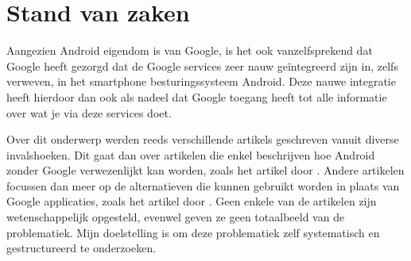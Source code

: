 
\section{Stand van zaken}
\label{sec:state-of-the-art}

Aangezien Android eigendom is van Google, is het ook vanzelfsprekend dat Google heeft gezorgd dat de Google services zeer nauw geïntegreerd zijn in, zelfs verweven, in het smartphone besturingssysteem Android. Deze nauwe integratie heeft hierdoor dan ook als nadeel dat Google toegang heeft tot alle informatie over wat je via deze services doet.

\vspace{2mm}

Over dit onderwerp werden reeds verschillende artikels geschreven vanuit diverse invalshoeken. Dit gaat dan over artikelen die enkel beschrijven hoe Android zonder Google verwezenlijkt kan worden, zoals het artikel door \autocite{BertelKing2016}. Andere artikelen focussen dan meer op de alternatieven die kunnen gebruikt worden in plaats van Google applicaties, zoals het artikel door \autocite{EricFerrari2017}. Geen enkele van de artikelen zijn wetenschappelijk opgesteld, evenwel geven ze geen totaalbeeld van de problematiek. Mijn doelstelling is om deze problematiek zelf systematisch en gestructureerd te onderzoeken.




